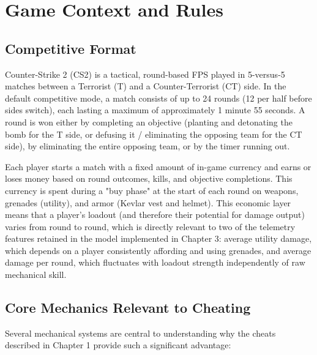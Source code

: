 \chapter{Game Context and Rules}
\label{annexe:two}

\fancyhead[LE]{\textsc{\chaptername~\thechapter}}

\section{Competitive Format}


Counter-Strike 2 (CS2) is a tactical, round-based FPS played in 5-versus-5 matches between a Terrorist (T) and a Counter-Terrorist (CT) side. In the default competitive mode, a match consists of up to 24 rounds (12 per half before sides switch), each lasting a maximum of approximately 1 minute 55 seconds. A round is won either by completing an objective (planting and detonating the bomb for the T side, or defusing it / eliminating the opposing team for the CT side), by eliminating the entire opposing team, or by the timer running out.


Each player starts a match with a fixed amount of in-game currency and earns or loses money based on round outcomes, kills, and objective completions. This currency is spent during a "buy phase" at the start of each round on weapons, grenades (utility), and armor (Kevlar vest and helmet). This economic layer means that a player's loadout (and therefore their potential for damage output) varies from round to round, which is directly relevant to two of the telemetry features retained in the model implemented in Chapter 3: average utility damage, which depends on a player consistently affording and using grenades, and average damage per round, which fluctuates with loadout strength independently of raw mechanical skill.


\section{Core Mechanics Relevant to Cheating}

Several mechanical systems are central to understanding why the cheats described in Chapter 1 provide such a significant advantage:


